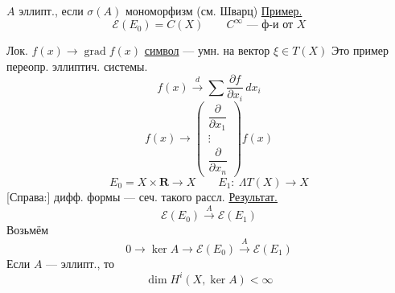 $A$ эллипт., если $\sigma(A)$ мономорфизм
(см. Шварц)
\underline{Пример.}
\begin{equation*}
\mathcal E(E_0)=C(X)\qquad C^\infty\text{ --- ф-и от }X
\end{equation*}

Лок. $f(x)\longrightarrow\operatorname{grad}f(x)$
\underline{символ} --- умн. на вектор $\xi\in T(X)$
Это пример переопр. эллиптич. системы.
\begin{equation*}
f(x)\overset d{\longrightarrow}\sum\frac{\partial f}{\partial x_i}\,dx_i
\end{equation*}
\begin{equation*}
f(x)\longrightarrow
\begin{pmatrix}\dfrac\partial{\partial x_1}\\\vdots\\\dfrac\partial{\partial x_n}\end{pmatrix}f(x)
\end{equation*}
\begin{equation*}
E_0=X\times\mathbf R\longrightarrow X\qquad
E_1:\ \Lambda T(X)\longrightarrow X
\end{equation*}
[Справа:] дифф. формы --- сеч. такого рассл.
\underline{Результат.}
\begin{equation*}
\mathcal E(E_0)\overset A{\longrightarrow}\mathcal E(E_1)
\end{equation*}
Возьмём
\begin{equation*}
0\longrightarrow\ker A\longrightarrow\mathcal E(E_0)
\overset A{\longrightarrow}\mathcal E(E_1)
\end{equation*}
Если $A$ --- эллипт., то
\begin{equation*}
\dim H^i(X,\ker A)<\infty
\end{equation*}
